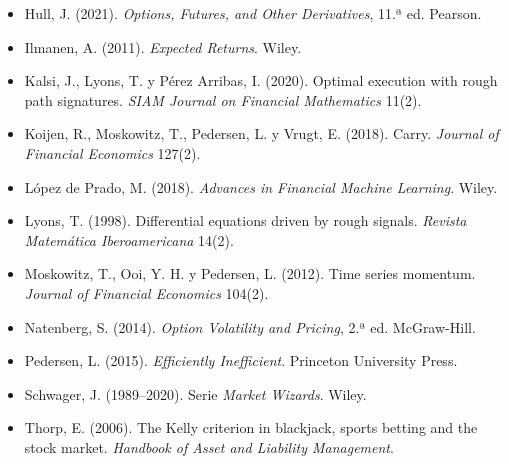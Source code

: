 \begin{itemize}
\item Hull, J. (2021). \emph{Options, Futures, and Other Derivatives}, 11.ª ed. Pearson.
\item Ilmanen, A. (2011). \emph{Expected Returns}. Wiley.
\item Kalsi, J., Lyons, T. y Pérez Arribas, I. (2020). Optimal execution with rough path signatures. \emph{SIAM Journal on Financial Mathematics} 11(2).
\item Koijen, R., Moskowitz, T., Pedersen, L. y Vrugt, E. (2018). Carry. \emph{Journal of Financial Economics} 127(2).
\item López de Prado, M. (2018). \emph{Advances in Financial Machine Learning}. Wiley.
\item Lyons, T. (1998). Differential equations driven by rough signals. \emph{Revista Matemática Iberoamericana} 14(2).
\item Moskowitz, T., Ooi, Y. H. y Pedersen, L. (2012). Time series momentum. \emph{Journal of Financial Economics} 104(2).
\item Natenberg, S. (2014). \emph{Option Volatility and Pricing}, 2.ª ed. McGraw-Hill.
\item Pedersen, L. (2015). \emph{Efficiently Inefficient}. Princeton University Press.
\item Schwager, J. (1989--2020). Serie \emph{Market Wizards}. Wiley.
\item Thorp, E. (2006). The Kelly criterion in blackjack, sports betting and the stock market. \emph{Handbook of Asset and Liability Management}.
\end{itemize}
